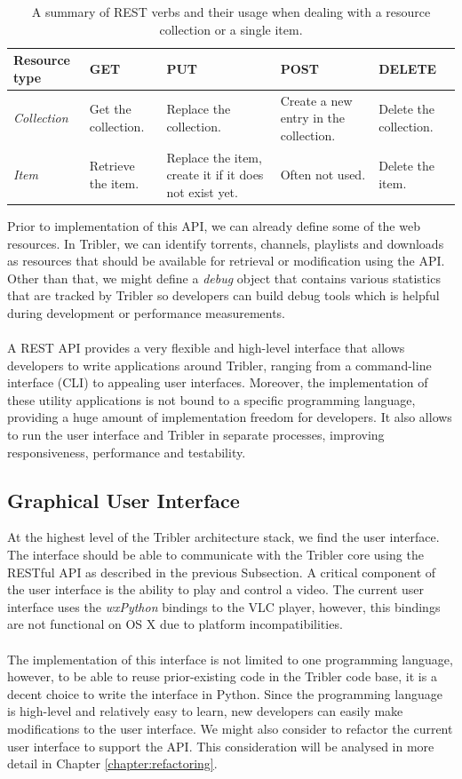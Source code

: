\begin{table}[h!]
	\centering
	\begin{tabularx}{\textwidth}{|X|X|X|X|X|}
		\hline
		Resource type & \textbf{GET} & \textbf{PUT} & \textbf{POST} & \textbf{DELETE} \\ \hline
		\emph{Collection} & Get the collection. & Replace the collection. & Create a new entry in the collection. & Delete the collection.\\ \hline
		\emph{Item} & Retrieve the item. & Replace the item, create it if it does not exist yet. & Often not used. & Delete the item.\\ \hline
	\end{tabularx}
	\caption{A summary of REST verbs and their usage when dealing with a resource collection or a single item.}
	\label{table:rest-api-operations}
\end{table}

Prior to implementation of this API, we can already define some of the web resources. In Tribler, we can identify torrents, channels, playlists and downloads as resources that should be available for retrieval or modification using the API. Other than that, we might define a \emph{debug} object that contains various statistics that are tracked by Tribler so developers can build debug tools which is helpful during development or performance measurements.\\\\
A REST API provides a very flexible and high-level interface that allows developers to write applications around Tribler, ranging from a command-line interface (CLI) to appealing user interfaces. Moreover, the implementation of these utility applications is not bound to a specific programming language, providing a huge amount of implementation freedom for developers. It also allows to run the user interface and Tribler in separate processes, improving responsiveness, performance and testability.

\subsection{Graphical User Interface}
At the highest level of the Tribler architecture stack, we find the user interface. The interface should be able to communicate with the Tribler core using the RESTful API as described in the previous Subsection. A critical component of the user interface is the ability to play and control a video. The current user interface uses the \emph{wxPython} bindings to the VLC player, however, this bindings are not functional on OS X due to platform incompatibilities.\\\\
The implementation of this interface is not limited to one programming language, however, to be able to reuse prior-existing code in the Tribler code base, it is a decent choice to write the interface in Python. Since the programming language is high-level and relatively easy to learn, new developers can easily make modifications to the user interface. We might also consider to refactor the current user interface to support the API. This consideration will be analysed in more detail in Chapter \ref{chapter:refactoring}. 

